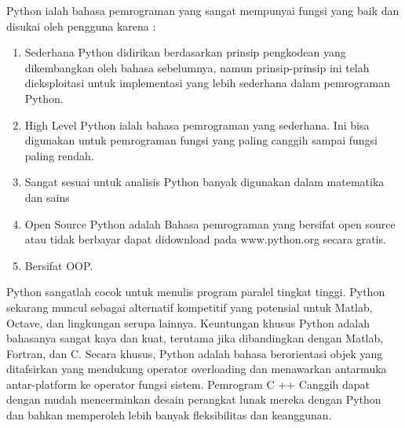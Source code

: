 \documentclass[12pt,a4paper]{article}
\begin{document}
Python ialah bahasa pemrograman yang sangat mempunyai fungsi yang baik dan disukai oleh pengguna karena :
\begin{enumerate}

\item Sederhana
Python didirikan berdasarkan prinsip pengkodean yang dikembangkan oleh bahasa sebelumnya, namun prinsip-prinsip ini telah dieksploitasi untuk implementasi yang lebih sederhana dalam pemrograman Python.

\item High Level
Python ialah bahasa pemrograman yang sederhana. Ini bisa digunakan untuk pemrograman fungsi yang paling canggih sampai fungsi paling rendah.

\item Sangat sesuai untuk analisis
 Python banyak digunakan dalam matematika dan sains
 
\item Open Source
Python adalah Bahasa pemrograman yang bersifat open source atau tidak berbayar dapat didownload pada www.python.org secara gratis.\\

\item Bersifat OOP.

\end{enumerate}

Python sangatlah cocok untuk menulis program paralel tingkat tinggi. Python sekarang muncul sebagai alternatif kompetitif yang potensial untuk Matlab, Octave, dan lingkungan serupa lainnya. Keuntungan khusus Python adalah bahasanya sangat kaya dan kuat, terutama jika dibandingkan dengan Matlab, Fortran, dan C. Secara khusus, Python adalah bahasa berorientasi objek yang ditafsirkan yang mendukung operator overloading dan menawarkan antarmuka antar-platform ke operator fungsi sistem. Pemrogram C ++ Canggih dapat dengan mudah mencerminkan desain perangkat lunak mereka dengan Python dan bahkan memperoleh lebih banyak fleksibilitas dan keanggunan.\\
\end{document}
